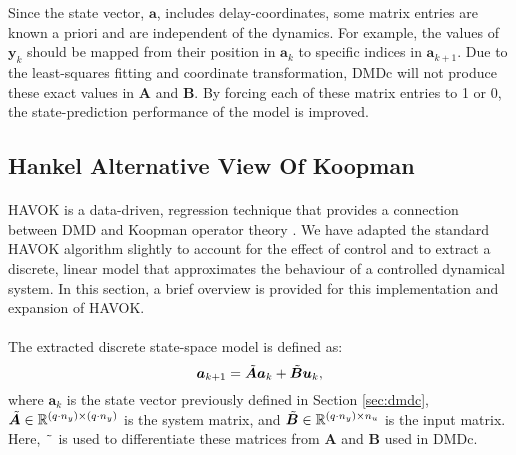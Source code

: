         Since the state vector, $\bm{a}$, includes delay-coordinates, some matrix entries are known a priori and are independent of the dynamics. For example, the values of $\bm{y}_{k}$ should be mapped from their position in $\bm{a}_k$ to specific indices in $\bm{a}_{k+1}$. Due to the least-squares fitting and coordinate transformation, DMDc will not produce these exact values in $\bm{A}$ and $\bm{B}$. By forcing each of these matrix entries to 1 or 0, the state-prediction performance of the model is improved.

        \subsection{Hankel Alternative View Of Koopman}
% 
    \paragraph{}
    HAVOK is a data-driven, regression technique that provides a connection between DMD and Koopman operator theory \cite{Brunton2017, Champion2019}. 
    We have adapted the standard HAVOK algorithm slightly to account for the effect of control and to extract a discrete, linear model that approximates the behaviour of a controlled dynamical system.
    In this section, a brief overview is provided for this implementation and expansion of \mbox{HAVOK}.
    \paragraph{}
    The extracted discrete state-space model is defined as:
    \begin{equation} \label{eq:havoc_state_space}
        \bm{a}_{k+1} = \Tilde{\bm{A}} \bm{a}_k + \Tilde{\bm{B}} \bm{u}_k ,
    \end{equation}
    where $\bm{a}_k$ is the state vector previously defined in Section \ref{sec:dmdc}, 
    \( \Tilde{\bm{A}} \in \mathbb{R}^{(q \cdot n_y) \times (q \cdot n_y)} \) is the system matrix, 
    and \( \Tilde{\bm{B}} \in \mathbb{R}^{(q \cdot n_y) \times n_u} \) is the input matrix. 
    Here, $\Tilde{\phantom{a}}$ is used to differentiate these matrices from $\bm{A}$ and $\bm{B}$ used in DMDc.
